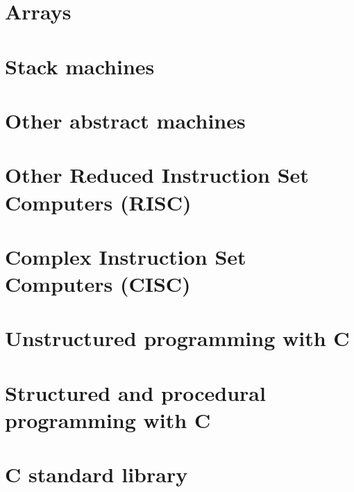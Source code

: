 \documentclass[oneside]{book}
\begin{document}
\part{Arrays}


\part{Stack machines}


\part{Other abstract machines}


\part{Other Reduced Instruction Set Computers (RISC)}




\part{Complex Instruction Set Computers (CISC)}







\part{Unstructured programming with C}














\part{Structured and procedural programming with C}







\part{C standard library}





\end{document}
